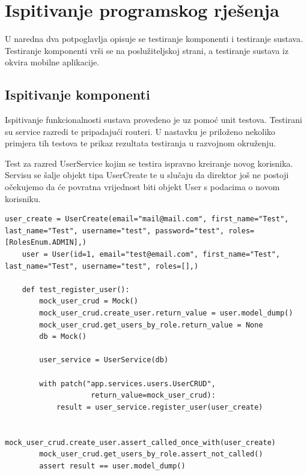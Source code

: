 			\eject 
		
	
		\section{Ispitivanje programskog rješenja}
			
			{U naredna dva potpoglavlja opisuje se testiranje komponenti i testiranje sustava. Testiranje komponenti vrši se na poslužiteljskoj strani, a testiranje sustava iz okvira mobilne aplikacije.}
	
			
			\subsection{Ispitivanje komponenti}
			
			{Ispitivanje funkcionalnosti sustava provedeno je uz pomoć unit testova. Testirani su service razredi te pripadajući routeri. U nastavku je priloženo nekoliko primjera tih testova te prikaz rezultata testiranja u razvojnom okruženju.\newline}
			
			{Test za razred UserService kojim se testira ispravno kreiranje novog korisnika. Servisu se šalje objekt tipa UserCreate te u slučaju da direktor još ne postoji očekujemo da će povratna vrijednost biti objekt User s podacima o novom korisniku.}
			
\begin{lstlisting}[style=pythonstyle]
	user_create = UserCreate(email="mail@mail.com",	first_name="Test", last_name="Test", username="test", password="test", roles=[RolesEnum.ADMIN],)
	user = User(id=1, email="test@email.com", first_name="Test", last_name="Test", username="test", roles=[],)
	
	def test_register_user():
		mock_user_crud = Mock()
		mock_user_crud.create_user.return_value = user.model_dump()
		mock_user_crud.get_users_by_role.return_value = None
		db = Mock()
		
		user_service = UserService(db)
		
		with patch("app.services.users.UserCRUD", 
					return_value=mock_user_crud):
			result = user_service.register_user(user_create)
		
		mock_user_crud.create_user.assert_called_once_with(user_create)
		mock_user_crud.get_users_by_role.assert_not_called()
		assert result == user.model_dump()
\end{lstlisting}
			
